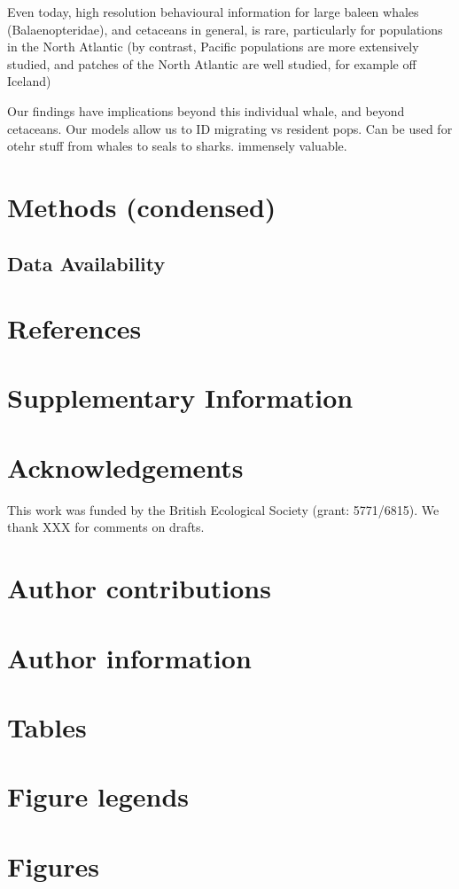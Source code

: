 \documentclass[a4paper,12pt]{article}
\begin{document}
Even today, high resolution behavioural information for large baleen whales (Balaenopteridae), and cetaceans in general, is rare, particularly for populations in the North Atlantic (by contrast, Pacific populations are more extensively studied, and patches of the North Atlantic are well studied, for example off Iceland)

Our findings have implications beyond this individual whale, and beyond cetaceans. Our models allow us  to ID migrating vs resident pops. Can be used for otehr stuff from whales to seals to sharks. immensely valuable.

\section{Methods (condensed)}

\subsection{Data Availability}

\section{References}

\section{Supplementary Information}

\section{Acknowledgements}
This work was funded by the British Ecological Society (grant: 5771/6815). 
We thank XXX for comments on drafts.

\section{Author contributions}

\section{Author information}

\section{Tables}

\section{Figure legends}




\newpage
\section{Figures}

\end{document}
